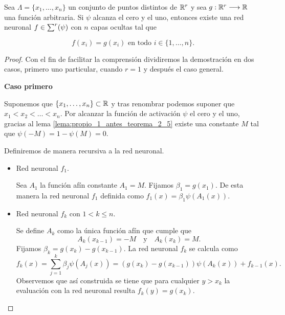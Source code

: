\begin{teorema}
    Sea $ \Lambda = \{x_1, \ldots, x_n\}$ un conjunto de puntos distintos de 
    $\mathbb{R}^r$ y sea 
    $g: \mathbb{R}^r \longrightarrow \mathbb{R}$ una función arbitraria. 
    Si $\psi$ alcanza el cero y el uno, 
    entonces
    existe una red neuronal $f \in \sum^r (\psi)$ con $n$
    capas ocultas tal que 

    \begin{equation}
        f(x_i) = g(x_i) \text{ en todo } i \in \{1, \ldots, n \}.
    \end{equation}
\end{teorema}
\begin{proof}
Con el fin de facilitar la comprensión dividiremos la demostración en dos casos, 
primero uno particular, cuando $r=1$ y después el caso general.

\textbf{Caso primero}

Suponemos que $\{x_1, \ldots, x_n\} \subset \mathbb{R}$ y tras renombrar 
podemos suponer que $x_1 < x_2 < \ldots < x_n.$ 
Por alcanzar la función de activación $\psi$ el cero y el uno, 
gracias al lema  \ref{lema:propio_1_antes_teorema_2_5} existe una constante $M$ tal que $\psi(-M) = 1-\psi(M) = 0.$

Definiremos de manera recursiva a la red neuronal. 

\begin{itemize}
    \item Red neuronal $f_1$. 

Sea $A_1$ la función afín constante $A_1 = M.$
Fijamos $\beta_1 = g(x_1)$. 
De esta manera la red neuronal $f_1$ 
definida como $f_1(x) = \beta_1 \psi(A_1(x)).$

\item Red neuronal $f_k$ con $1 < k \leq n$. 

Se define $A_{k}$ como la única función afín que cumple que 
\begin{equation}
    A_k(x_{k-1}) = -M \quad \text{y} \quad  A_{k}(x_k)= M.
\end{equation}
Fijamos $\beta_k = g(x_k) - g(x_{k-1})$. 
La red neuronal $f_k$ se calcula como 
\begin{equation}
    f_k(x) 
    = 
    \sum_{j=1}^k \beta_j \psi(A_j(x))
     = 
    (g(x_k)-g(x_{k-1})) \psi(A_k(x)) + f_{k-1}(x) .  
\end{equation}
Observemos que así construida se tiene que para cualquier
 $y > x_k$ la evaluación con la red neuronal resulta $f_k(y) = g(x_k).$


\end{itemize}
\end{proof}
